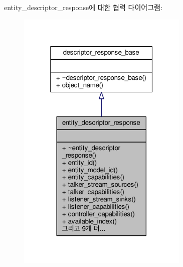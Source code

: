 entity\+\_\+descriptor\+\_\+response에 대한 협력 다이어그램\+:
\nopagebreak
\begin{figure}[H]
\begin{center}
\leavevmode
\includegraphics[width=232pt]{classavdecc__lib_1_1entity__descriptor__response__coll__graph}
\end{center}
\end{figure}
